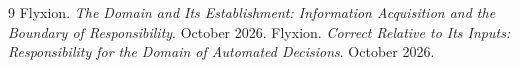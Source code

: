 \documentclass[11pt]{article}
\theoremstyle{plain}
\theoremstyle{definition}
\begin{document}
\begin{thebibliography}{9}
 Flyxion. \emph{The Domain and Its Establishment: Information Acquisition and the Boundary of Responsibility}. October 2026.
 Flyxion. \emph{Correct Relative to Its Inputs: Responsibility for the Domain of Automated Decisions}. October 2026.
\end{thebibliography}
\end{document}
